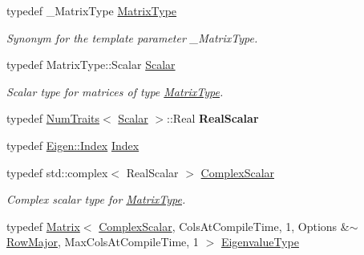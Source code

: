 \begin{DoxyCompactItemize}
\mbox{\label{group___eigenvalues___module_a83acd180404ddaac8a678fa65a6b632b}} 
typedef \+\_\+\+Matrix\+Type \hyperlink{group___eigenvalues___module_a83acd180404ddaac8a678fa65a6b632b}{Matrix\+Type}
\begin{DoxyCompactList}\small\item\em Synonym for the template parameter {\ttfamily \+\_\+\+Matrix\+Type}. \end{DoxyCompactList}\item 
\mbox{\label{group___eigenvalues___module_a017d49fe0d59874b70a2fcf35e5aa373}} 
typedef Matrix\+Type\+::\+Scalar \hyperlink{group___eigenvalues___module_a017d49fe0d59874b70a2fcf35e5aa373}{Scalar}
\begin{DoxyCompactList}\small\item\em Scalar type for matrices of type \hyperlink{group___eigenvalues___module_a83acd180404ddaac8a678fa65a6b632b}{Matrix\+Type}. \end{DoxyCompactList}\item 
\mbox{\label{group___eigenvalues___module_aad50fbc086d07e69015426ffd11f7e44}} 
typedef \hyperlink{group___core___module_struct_eigen_1_1_num_traits}{Num\+Traits}$<$ \hyperlink{group___eigenvalues___module_a017d49fe0d59874b70a2fcf35e5aa373}{Scalar} $>$\+::Real {\bfseries Real\+Scalar}
\item 
typedef \hyperlink{namespace_eigen_a62e77e0933482dafde8fe197d9a2cfde}{Eigen\+::\+Index} \hyperlink{group___eigenvalues___module_a5bff6a6bc0efac67d52c60c2c3deb9ee}{Index}
\item 
typedef std\+::complex$<$ Real\+Scalar $>$ \hyperlink{group___eigenvalues___module_a4d0b2a773357d0a6ec98e026f04002ed}{Complex\+Scalar}
\begin{DoxyCompactList}\small\item\em Complex scalar type for \hyperlink{group___eigenvalues___module_a83acd180404ddaac8a678fa65a6b632b}{Matrix\+Type}. \end{DoxyCompactList}\item 
typedef \hyperlink{group___core___module_class_eigen_1_1_matrix}{Matrix}$<$ \hyperlink{group___eigenvalues___module_a4d0b2a773357d0a6ec98e026f04002ed}{Complex\+Scalar}, Cols\+At\+Compile\+Time, 1, Options \&$\sim$\hyperlink{group__enums_ggaacded1a18ae58b0f554751f6cdf9eb13acfcde9cd8677c5f7caf6bd603666aae3}{Row\+Major}, Max\+Cols\+At\+Compile\+Time, 1 $>$ \hyperlink{group___eigenvalues___module_adc446bcb60572758fa64515f2825db62}{Eigenvalue\+Type}

\end{DoxyCompactItemize}
